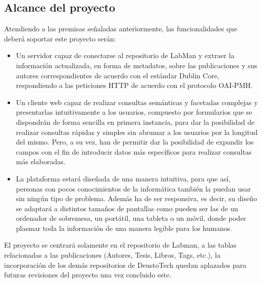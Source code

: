 \subsection{Alcance del proyecto}

Atendiendo a las premisas señaladas anteriormente, las funcionalidades que deberá soportar este proyecto serán:

\begin{itemize}
	\item Un servidor capaz de conectarse al repositorio de LabMan y extraer la información actualizada, en forma de metadatos, sobre las publicaciones y sus autores correspondientes de acuerdo con el estándar Dublin Core, respondiendo a las peticiones HTTP de acuerdo con el protocolo OAI-PMH.
	
	\item Un cliente web capaz de realizar consultas semánticas y facetadas complejas y presentarlas intuitivamente a los usuarios, compuesto por formularios que se dispondrán de forma sencilla en primera instancia, para dar la posibilidad de realizar consultas rápidas y simples sin abrumar a los usuarios por la longitud del mismo. Pero, a su vez, han de permitir dar la posibilidad de expandir los campos con el fin de introducir datos más específicos para realizar consultas más elaboradas.

	\item La plataforma estará diseñada de una manera intuitiva, para que así, personas con pocos conocimientos de la informática también la puedan usar sin ningún tipo de problema. Además ha de ser responsiva, es decir, su diseño se adaptará a distintos tamaños de pantallas como pueden ser las de un ordenador de sobremesa, un portátil, una tableta o un móvil, donde poder plasmar toda la información de una manera legible para los humanos.
\end{itemize}

El proyecto se centrará solamente en el repositorio de Labman, a las tablas relacionadas a las publicaciones (Autores, Tesis, Libros, Tags, etc.), la incorporación de los demás repositorios de DeustoTech quedan aplazados para futuras revisiones del proyecto una vez concluido este.